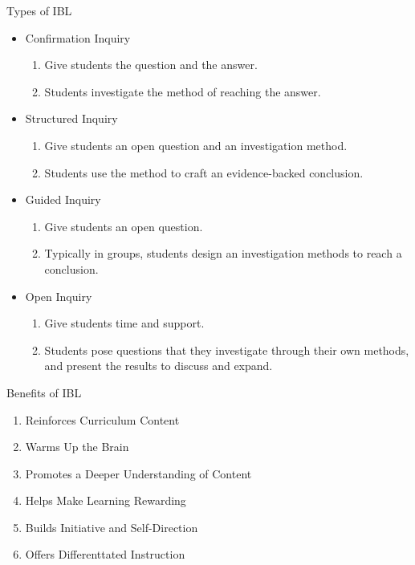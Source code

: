 \documentclass{beamer}
\begin{document}
\begin{frame}{Types of IBL}
\justifying
\begin{itemize}
    \item Confirmation Inquiry
    \begin{enumerate}
        \justifying
        \item Give students the question and the answer.
        \item Students investigate the method of reaching the answer.
    \end{enumerate}
    \item Structured Inquiry
    \begin{enumerate}
        \justifying
        \item Give students an open question and an investigation method.
        \item Students use the method to craft an evidence-backed conclusion.
    \end{enumerate}
    \item Guided Inquiry
    \begin{enumerate}
        \justifying
        \item Give students an open question.
        \item Typically in groups, students design an investigation methods to reach a conclusion.
    \end{enumerate}
    \item Open Inquiry
    \begin{enumerate}
        \justifying
        \item Give students time and support.
        \item Students pose questions that they investigate through their own methods, and present the results to discuss and expand.
    \end{enumerate}
\end{itemize}
\end{frame}

\begin{frame}{Benefits of IBL}
    \begin{enumerate}
        \justifying
        \item Reinforces Curriculum Content
        \item Warms Up the Brain
        \item Promotes a Deeper Understanding of Content
        \item Helps Make Learning Rewarding
        \item Builds Initiative and Self-Direction
        \item Offers Differenttated Instruction
    \end{enumerate}
\end{frame}
\end{document}
